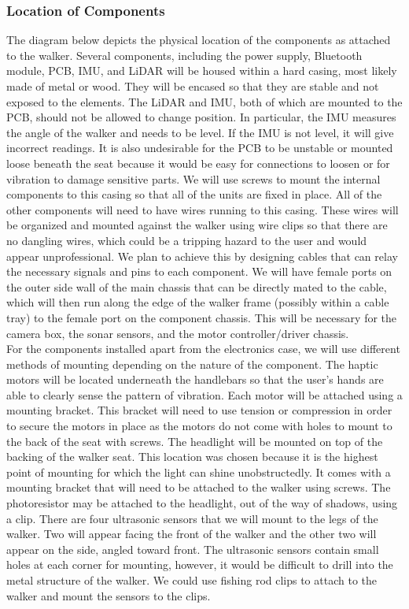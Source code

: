 \subsubsection{Location of Components}
\noindent The diagram below depicts the physical location of the components as attached to the walker. Several components, including the power supply, Bluetooth module, PCB, IMU, and LiDAR will be housed within a hard casing, most likely made of metal or wood. They will be encased so that they are stable and not exposed to the elements. The LiDAR and IMU, both of which are mounted to the PCB, should not be allowed to change position. In particular, the IMU measures the angle of the walker and needs to be level. If the IMU is not level, it will give incorrect readings. It is also undesirable for the PCB to be unstable or mounted loose beneath the seat because it would be easy for connections to loosen or for vibration to damage sensitive parts. We will use screws to mount the internal components to this casing so that all of the units are fixed in place. All of the other components will need to have wires running to this casing. These wires will be organized and mounted against the walker using wire clips so that there are no dangling wires, which could be a tripping hazard to the user and would appear unprofessional. We plan to achieve this by designing cables that can relay the necessary signals and pins to each component. We will have female ports on the outer side wall of the main chassis that can be directly mated to the cable, which will then run along the edge of the walker frame (possibly within a cable tray) to the female port on the component chassis. This will be necessary for the camera box, the sonar sensors, and the motor controller/driver chassis. \\



\noindent For the components installed apart from the electronics case, we will use different methods of mounting depending on the nature of the component. The haptic motors will be located underneath the handlebars so that the user's hands are able to clearly sense the pattern of vibration. Each motor will be attached using a mounting bracket. This bracket will need to use tension or compression in order to secure the motors in place as the motors do not come with holes to mount to the back of the seat with screws. The headlight will be mounted on top of the backing of the walker seat. This location was chosen because it is the highest point of mounting for which the light can shine unobstructedly. It comes with a mounting bracket that will need to be attached to the walker using screws. The photoresistor may be attached to the headlight, out of the way of shadows, using a clip. There are four ultrasonic sensors that we will mount to the legs of the walker. Two will appear facing the front of the walker and the other two will appear on the side, angled toward front. The ultrasonic sensors contain small holes at each corner for mounting, however, it would be difficult to drill into the metal structure of the walker. We could use fishing rod clips to attach to the walker and mount the sensors to the clips.\\

